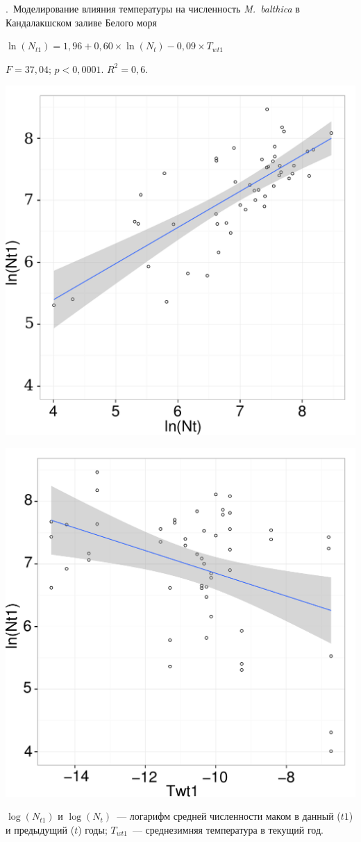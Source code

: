 \documentclass[aspectratio=169, xcolor=table]{beamer}
\begin{document}
\begin{frame}{\insertpagenumber.\ Моделирование влияния температуры на численность {\it M.~balthica} в Кандалакшском заливе Белого моря}
\begin{center}
{\large $\ln(N_{t1}) = 1,96 + 0,60 \times \ln(N_{t}) - 0,09 \times T_{wt1}$}
\end{center}
{\scriptsize $F = 37,04$; $p < 0,0001$. $R^2 = 0,6$.} \\
	\begin{minipage}[t]{.49\linewidth}
		\begin{center}
			\includegraphics[width=.79\textwidth]{./lodNt_vs_logNt1_2.pdf}
		\end{center}
	\end{minipage}
%
	\begin{minipage}[t]{.49\linewidth}
		\begin{center}
			\includegraphics[width=.79\textwidth]{./Twt1_vs_logNt1_2.pdf}
		\end{center}
	\end{minipage}
{\tiny $\log(N_{t1})$ и $\log(N_{t})$~--- логарифм средней численности маком в данный ($t1$) и предыдущий ($t$) годы; $T_{wt1}$~--- среднезимняя температура в текущий год.}
\end{frame}
\end{document}
